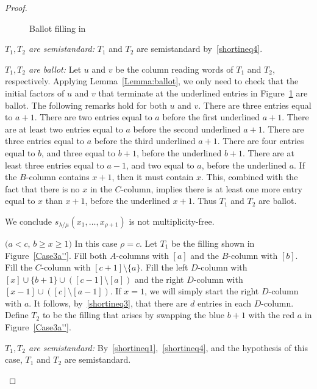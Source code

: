 \begin{proof}
\begin{Case}
\begin{figure}[b]
\begin{tikzpicture}[scale =2]
 \end{tikzpicture}
 \caption[Ballot filling in Case 3.1.1]{Ballot filling in }
 \label{Case3a'}
\end{figure}

\emph{$T_1,T_2$ are semistandard:} $T_1$ and $T_2$ are semistandard by~\eqref{shortineq4}.

\emph{$T_1,T_2$ are ballot:} Let $u$ and $v$ be the column reading words of $T_1$ and $T_2$, respectively. Applying Lemma~\ref{Lemma:ballot}, we only need to check that the initial factors of $u$ and $v$ that terminate at the underlined entries in Figure~\ref{Case3a'} are ballot. The following remarks hold for both $u$ and $v$. There are three entries equal to $a+1$. There are two entries equal to $a$ before the first underlined $a+1$. There are at least two entries equal to $a$ before the second underlined $a+1$. There are three entries equal to $a$ before the third underlined $a+1$. There are four entries equal to $b$, and three equal to $b+1$, before the underlined $b+1$. There are at least three entries equal to $a-1$, and two equal to $a$, before the underlined $a$. If the $B$-column contains $x+1$, then it must contain $x$. This, combined with the fact that there is no $x$ in the $C$-column, implies there is at least one more entry equal to $x$ than $x+1$, before the underlined $x+1$. Thus $T_1$ and $T_2$ are ballot.

We conclude $s_{\lambda/\mu}(x_1,\ldots,x_{\rho+1})$ is not multiplicity-free.



\end{Case}

\begin{Case}
{ $(a< c$, $b\geq x\geq 1)$} 
In this case $\rho = c$. Let $T_1$ be the filling shown in Figure~\ref{Case3a''}. Fill both $A$-columns with $[a]$ and the $B$-column with $[b]$. Fill the $C$-column with $[c+1]\setminus \{a\}$. Fill the left $D$-column with $[x]\cup \{b+1\} \cup ([c-1]\setminus [a])$ and the right $D$-column with $[x-1]\cup ([c]\setminus [a-1])$. If $x=1$, we will simply start the right $D$-column with $a$. It follows, by~\eqref{shortineq3}, that there are $d$ entries in each $D$-column. Define $T_2$ to be the filling that arises by swapping the blue $b+1$ with the red $a$ in Figure~\ref{Case3a''}.

\emph{$T_1,T_2$ are semistandard:} By~\eqref{shortineq1},~\eqref{shortineq4}, and the hypothesis of this case, $T_1$ and $T_2$ are semistandard.


\end{Case}
\end{proof}
